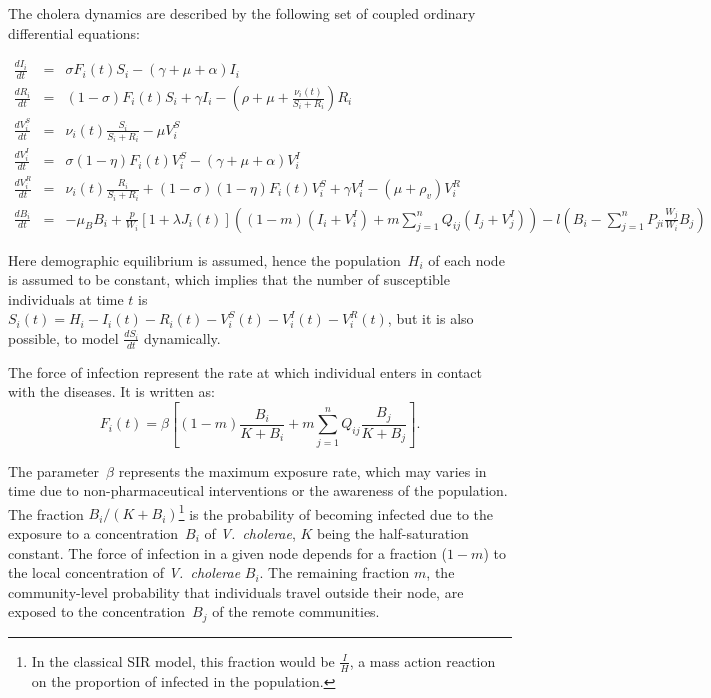 The cholera dynamics are described by the following set of coupled ordinary differential equations:
\begin{fullwidth}

\begingroup
\allowdisplaybreaks
\begin{eqnarray}
\frac{dI_i}{dt} &=& \sigma F_i(t) S_i - (\gamma + \mu + \alpha) I_i \label{eq:I2}\\
\frac{dR_i}{dt} &=& (1-\sigma) F_i(t) S_i + \gamma I_i - (\rho + \mu+\frac{\nu_i(t)}{S_i+R_i}) R_i \label{eq:R2}\\
\frac{dV^S_i}{dt} &=& \nu_i(t) \frac{S_i}{S_i+R_i}-\mu V^S_i \label{eq:VS2}\\
\frac{dV^I_i}{dt} &=& \sigma (1-\eta) F_i(t) V^S_i - (\gamma + \mu + \alpha) V^I_i \label{eq:VI2}\\
\frac{dV^R_i}{dt} &=& \nu_i(t) \frac{R_i}{S_i+R_i} + (1-\sigma) (1-\eta) F_i(t) V^S_i + \gamma V^I_i - (\mu+\rho_v) V^R_i \label{eq:VR2}\\
\frac{dB_i}{dt} &=& - \mu_B B_i +\frac{p}{W_i}\left[1 + \lambda J_i(t) \right] \left((1-m)(I_i +V_i^I)+m \sum_{j=1}^n Q_{ij} (I_j +V_j^I)\right)-  l \left( B_i - \sum_{j=1}^n P_{ji} \frac{W_j}{W_i} B_j \right)
\end{eqnarray}
\endgroup
\end{fullwidth}
Here demographic equilibrium is assumed, hence the population~$H_i$ of each node is assumed to be constant, which implies that the number of susceptible individuals at time $t$ is $S_i(t) = H_i - I_i(t) - R_i(t) - V_i^S(t) - V^I_i(t) - V_i^R(t)$, but it is also possible, to model $\frac{dS_i}{dt}$ dynamically.   

The force of infection represent the rate at which individual enters in contact with the diseases. It is written as:
\begin{equation}
F_i(t) = \beta \left[ (1 - m) \frac{B_i}{K + B_i} + m \sum_{j=1}^n Q_{ij} \frac{B_j}{K + B_j} \right].
\label{force}
\end{equation}

The parameter~$\beta$ represents the maximum exposure rate, which may varies in time due to non-pharmaceutical interventions or the awareness of the population\cite{Bertuzzo:ProbabilityExtinctionHaiti:2016}. The fraction $B_{i}/(K+B_{i})$\footnote{In the classical SIR model, this fraction would be $\frac{I}{H}$, a mass action reaction on the proportion of infected in the population.} is the probability of becoming infected due to the exposure to a concentration~$B_i$ of \textit{V.~cholerae}, $K$ being the half-saturation constant\cite{Codeco:EndemicEpidemicDynamics:2001}. The force of infection in a given node depends for a fraction ($1-m$) to the local concentration of \textit{V.~cholerae} $B_i$. The remaining fraction $m$, the community-level probability that individuals travel outside their node, are exposed to the concentration~$B_j$ of the remote communities. 

